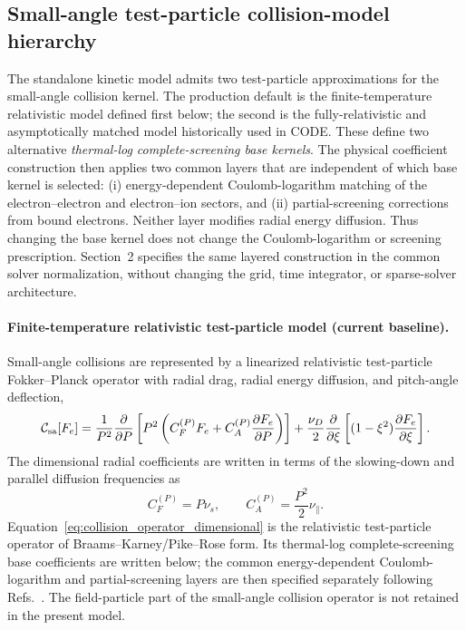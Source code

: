 \documentclass[11pt]{article}
\begin{document}
\subsection{Small-angle test-particle collision-model hierarchy}

The standalone kinetic model admits two test-particle approximations for the
small-angle collision kernel.  The production default is the finite-temperature
relativistic model defined first below; the second is the fully-relativistic and
asymptotically matched model historically used in CODE.  These define two alternative
\emph{thermal-log complete-screening base kernels}.  The physical coefficient construction
then applies two common layers that are independent of which base kernel is selected:
(i) energy-dependent Coulomb-logarithm matching of the electron--electron and
electron--ion sectors, and (ii) partial-screening corrections from bound electrons.
Neither layer modifies radial energy diffusion.  Thus changing the base kernel does not
change the Coulomb-logarithm or screening prescription.  Section~2 specifies the same
layered construction in the common solver normalization, without changing the grid, time
integrator, or sparse-solver architecture.

\paragraph{Finite-temperature relativistic test-particle model (current baseline).}
Small-angle collisions are represented by a linearized relativistic test-particle
Fokker--Planck operator with radial drag, radial energy diffusion, and pitch-angle
deflection,
\begin{equation}
 \mathcal C_{\rm sa}[F_e]
 =\frac{1}{P^2}\frac{\partial}{\partial P}
  \left[
   P^2\left(
      C_F^{(P)} F_e
      + C_A^{(P)}\frac{\partial F_e}{\partial P}
   \right)
  \right]
 +\frac{\nu_D}{2}\frac{\partial}{\partial\xi}
  \left[(1-\xi^2)\frac{\partial F_e}{\partial\xi}\right].
 \label{eq:collision_operator_dimensional}
\end{equation}
The dimensional radial coefficients are written in terms of the slowing-down and
parallel diffusion frequencies as
\begin{equation}
 C_F^{(P)}=P\nu_s,
 \qquad
 C_A^{(P)}=\frac{P^2}{2}\nu_\parallel.
 \label{eq:dimensional_collision_coeffs}
\end{equation}
Equation~\eqref{eq:collision_operator_dimensional} is the relativistic test-particle
operator of Braams--Karney/Pike--Rose form.  Its thermal-log complete-screening base
coefficients are written below; the common energy-dependent Coulomb-logarithm and
partial-screening layers are then specified separately following
Refs.~\cite{BraamsKarney1989,PikeRose2014,Hesslow2018Collision,Hesslow2019Dreicer}.
The field-particle part of the small-angle collision operator is not retained in the
present model.
\end{document}
